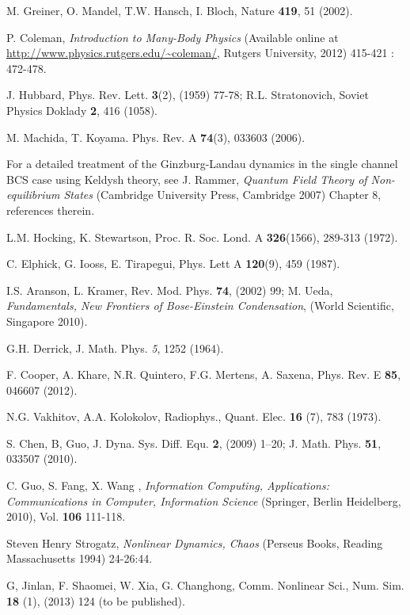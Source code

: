 \documentclass[aps,pra,floats,epsfig,pdflatex]{revtex4}                                                              %
\begin{document}
\begin{thebibliography}{}
M. Greiner, O. Mandel, T.W. Hansch, I. Bloch, Nature \textbf{419}, 51 (2002).

P. Coleman, \textit{Introduction to Many-Body Physics} (Available online at \url{http://www.physics.rutgers.edu/~coleman/}, Rutgers University, 2012) 415-421 : 472-478.

J. Hubbard, {Phys. Rev. Lett.} \textbf{3}(2), (1959) 77-78; R.L. Stratonovich, {Soviet Physics Doklady} \textbf{2}, 416 (1058).

M. Machida, T. Koyama. {Phys. Rev. A} \textbf{74}(3), 033603 (2006).

For a detailed treatment of the Ginzburg-Landau dynamics in the single channel BCS case using Keldysh theory, see
J. Rammer, \textit{Quantum Field Theory of Non-equilibrium States} (Cambridge University Press, Cambridge 2007) Chapter 8, references therein.

L.M. Hocking, K. Stewartson, Proc. R. Soc. Lond. A \textbf{326}(1566), 289-313 (1972).

C. Elphick, G. Iooss, E. Tirapegui, Phys. Lett A \textbf{120}(9), 459 (1987).

I.S. Aranson, L. Kramer, Rev. Mod. Phys. \textbf{74}, (2002) 99; M. Ueda, \textit{Fundamentals, New Frontiers of Bose-Einstein Condensation}, (World Scientific, Singapore 2010).

G.H. Derrick, J. Math. Phys. \textit{5}, 1252 (1964).

F. Cooper, A. Khare, N.R. Quintero, F.G. Mertens, A. Saxena, Phys. Rev. E \textbf{85}, 046607 (2012).

N.G. Vakhitov, A.A. Kolokolov, Radiophys., Quant. Elec. \textbf{16} (7), 783 (1973).

S. Chen, B, Guo, J. Dyna. Sys. Diff. Equ. \textbf{2}, (2009) 1–20; J. Math. Phys. \textbf{51}, 033507 (2010).

C. Guo, S. Fang, X. Wang , \textit{Information Computing, Applications: Communications in Computer, Information Science} (Springer, Berlin Heidelberg, 2010), Vol. \textbf{106} 111-118.

Steven Henry Strogatz, \textit{Nonlinear Dynamics, Chaos} (Perseus Books, Reading Massachusetts 1994) 24-26:44.

G, Jinlan, F. Shaomei, W. Xia, G. Changhong, Comm. Nonlinear Sci., Num. Sim. \textbf{18} (1), (2013) 124 (to be published).


\end{thebibliography}
\end{document}
